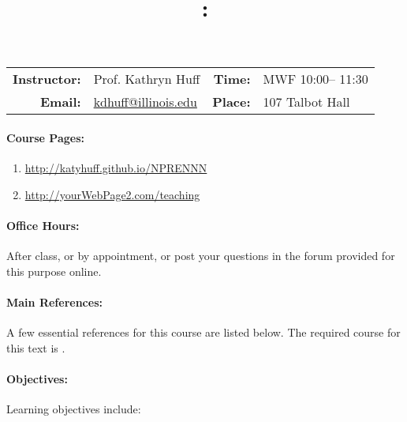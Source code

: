 \documentclass[11pt, a4paper]{article}
\title{\CourseNumber: \CourseTitle\\}
\author{\CourseUniversity}
\date{\CourseSemester \CourseYear}
\makeatletter
\newcommand{\CourseNumber}{NPRENNN}
\newcommand{\CourseInstructor}{Prof. Kathryn Huff\xspace}%
\newcommand{\CourseDays}{MWF\xspace}%
\newcommand{\CourseStart}{10:00\xspace}%
\newcommand{\CourseEnd}{11:30\xspace}%
\newcommand{\CourseInstructorEmail}{kdhuff@illinois.edu}
\newcommand{\CourseRoom}{107\xspace}%
\newcommand{\CourseBuilding}{Talbot Hall\xspace}%
\makeatother
\begin{document}
\maketitle
\renewcommand{\arraystretch}{2}
\begin{center}
\begin{table}[h]
\begin{tabularx}{\textwidth}{rXrX}
\hline
\textbf{Instructor:} & \CourseInstructor & \textbf{Time:} & \CourseDays \CourseStart -- \CourseEnd \\
\textbf{Email:} &  \href{mailto:\CourseInstructorEmail}{\CourseInstructorEmail} & \textbf{Place:} & \CourseRoom \CourseBuilding\\
\hline
\end{tabularx}
\end{table}
\end{center}

\paragraph{Course Pages:}
\begin{enumerate}
\item \url{http://katyhuff.github.io/\CourseNumber}
\item \url{http://yourWebPage2.com/teaching}
\end{enumerate}

\paragraph{Office Hours:} After class, or by appointment, or post your 
questions in the forum provided for this purpose online.

\paragraph{Main References:}
A few essential references for this course are listed below. The required course for this text is \cite{req}.
\nocite{*}

\renewcommand{\refname}{\normalfont\selectfont\normalsize}\vspace{-1cm} 


\paragraph{Objectives:} 

Learning objectives include:
\end{document}
